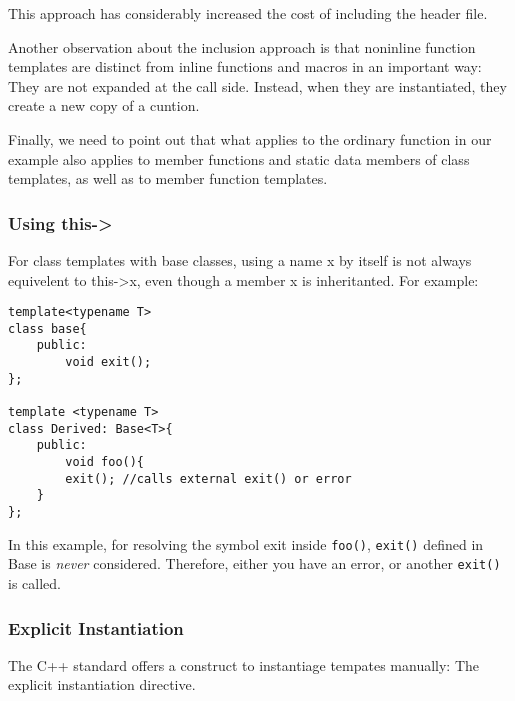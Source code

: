 \documentclass[a4paper,12pt]{book}
\begin{document}
This approach has considerably increased the cost of including the header file.

Another observation about the inclusion approach is that noninline function templates are distinct from inline functions and macros in an important way: They are not expanded at the call side. Instead, when they are instantiated, they create a new copy of a cuntion.

Finally, we need to point out that what applies to the ordinary function in our example also applies to member functions and static data members of class templates, as well as to member function templates.
\subsubsection{Using this->}
For class templates with base classes, using a name x by itself is not always equivelent to this->x, even though a member x is inheritanted. For example:
\begin{verbatim}
template<typename T>
class base{
    public:
        void exit();
};

template <typename T>
class Derived: Base<T>{
    public:
        void foo(){
	    exit(); //calls external exit() or error
	}
};
\end{verbatim}

In this example, for resolving the symbol exit inside \verb|foo()|, \verb|exit()| defined in Base is \emph{never} considered. Therefore, either you have an error, or another \verb|exit()| is called.

\subsubsection{Explicit Instantiation}
The C++ standard offers a construct to instantiage tempates manually: The explicit instantiation directive.
\end{document}
